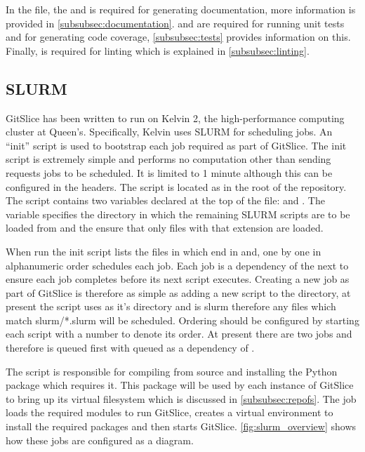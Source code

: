 \documentclass[11pt]{article}
\begin{document}
    In the  file, the  and  is required for generating documentation, more information is provided in \autoref{subsubsec:documentation}.
     and  are required for running unit tests and for generating code coverage, \autoref{subsubsec:tests} provides information on this.
    Finally,  is required for linting which is explained in \autoref{subsubsec:linting}.

    \subsection{SLURM}
    \label{subsec:slurm}

    GitSlice has been written to run on Kelvin 2, the high-performance computing cluster at Queen's.
    Specifically, Kelvin uses SLURM for scheduling jobs.
    An ``init'' script is used to bootstrap each job required as part of GitSlice.
    The init script is extremely simple and performs no computation other than sending requests jobs to be scheduled.
    It is limited to 1 minute although this can be configured in the headers.
    The script is located as  in the root of the repository.
    The script contains two variables declared at the top of the file:  and .
    The  variable specifies the directory in which the remaining SLURM scripts are to be loaded from and the  ensure that only files with that extension are loaded.

    When run the init script lists the files in  which end in  and, one by one in alphanumeric order schedules each job.
    Each job is a dependency of the next to ensure each job completes before its next script executes.
    Creating a new job as part of GitSlice is therefore as simple as adding a new script to the  directory, at present the script uses  as it's directory and  is slurm therefore any files which match slurm/*.slurm will be scheduled.
    Ordering should be configured by starting each script with a number to denote its order.
    At present there are two jobs  and  therefore  is queued first with  queued as a dependency of .

    The  script is responsible for compiling  from source and installing the  Python package which requires it.
    This package will be used by each instance of GitSlice to bring up its virtual filesystem which is discussed in \autoref{subsubsec:repofs}.
    The  job loads the required modules to run GitSlice, creates a virtual environment to install the required packages and then starts GitSlice.
    \autoref{fig:slurm_overview} shows how these jobs are configured as a diagram.
\end{document}
